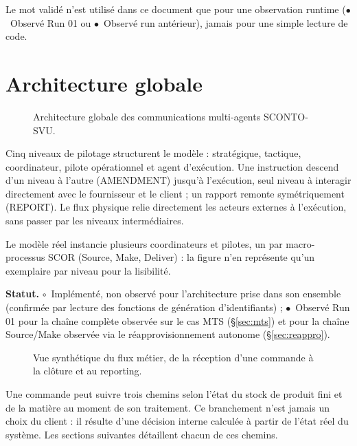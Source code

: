 \documentclass[11pt,a4paper]{article}
\newcommand{\stRUN}{\ensuremath{\bullet}~Observé Run 01}
\newcommand{\stANT}{\ensuremath{\bullet}~Observé run antérieur}
\newcommand{\stIMP}{\ensuremath{\circ}~Implémenté, non observé}
\newcommand{\statut}[1]{\textbf{Statut.} #1}
\begin{document}
Le mot \og{} validé \fg{} n'est utilisé dans ce document que pour une observation runtime (\stRUN{} ou \stANT{}), jamais pour une simple lecture de code.

\section{Architecture globale}

\begin{figure}[H]
\centering
\resizebox{\textwidth}{!}{}
\caption{Architecture globale des communications multi-agents SCONTO-SVU.}
\label{fig:archi-globale}
\end{figure}

Cinq niveaux de pilotage structurent le modèle : stratégique, tactique, coordinateur, pilote opérationnel et agent d'exécution. Une instruction descend d'un niveau à l'autre (AMENDMENT) jusqu'à l'exécution, seul niveau à interagir directement avec le fournisseur et le client ; un rapport remonte symétriquement (REPORT). Le flux physique relie directement les acteurs externes à l'exécution, sans passer par les niveaux intermédiaires.

Le modèle réel instancie plusieurs coordinateurs et pilotes, un par macro-processus SCOR (Source, Make, Deliver) : la figure n'en représente qu'un exemplaire par niveau pour la lisibilité.

\statut{\stIMP{} pour l'architecture prise dans son ensemble (confirmée par lecture des fonctions de génération d'identifiants) ; \stRUN{} pour la chaîne complète observée sur le cas MTS (\S\ref{sec:mts}) et pour la chaîne Source/Make observée via le réapprovisionnement autonome (\S\ref{sec:reappro}).}

\begin{figure}[H]
\centering
\resizebox{\textwidth}{!}{}
\caption{Vue synthétique du flux métier, de la réception d'une commande à la clôture et au reporting.}
\label{fig:act01}
\end{figure}

Une commande peut suivre trois chemins selon l'état du stock de produit fini et de la matière au moment de son traitement. Ce branchement n'est jamais un choix du client : il résulte d'une décision interne calculée à partir de l'état réel du système. Les sections suivantes détaillent chacun de ces chemins.
\end{document}
